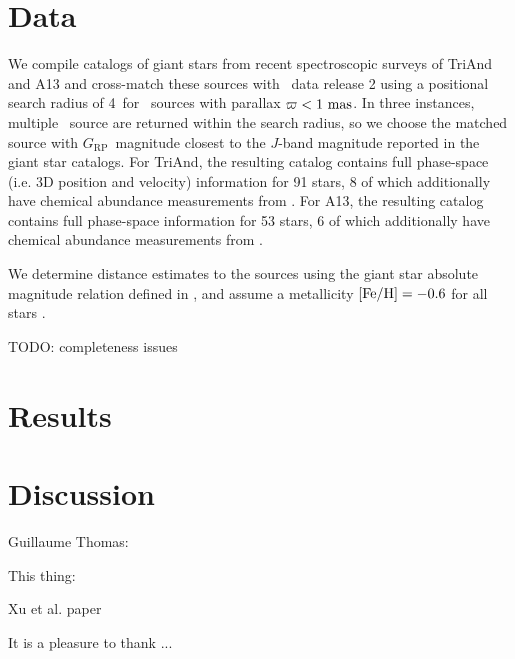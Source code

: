 \documentclass[twocolumn]{aastex62}
\newcommand{\gaia}{\project{Gaia}}
\newcommand{\dr}[1]{\acronym{DR#1}}
\newcommand{\rp}{\ensuremath{G_{\textrm{RP}}}}
\begin{document}
\section{Data}
\label{sec:data}

We compile catalogs of giant stars from recent spectroscopic surveys of TriAnd
and A13 \citep{Sheffield:2014, Li:2017, Bergemann:2018} and cross-match these
sources with \gaia\ data release 2 \citep[\dr{2};][]{TODO} using a positional
search radius of 4\arcsec\ for \gaia\ sources with parallax $\varpi < 1~\textrm{mas}$.
In three instances, multiple \gaia\ source are returned within the search
radius, so we choose the matched source with \rp\ magnitude closest to the
$J$-band magnitude reported in the giant star catalogs.
For TriAnd, the resulting catalog contains full phase-space (i.e. 3D position
and velocity) information for 91 stars, 8 of which additionally have chemical
abundance measurements from \citet{Bergemann:2018}.
For A13, the resulting catalog contains full phase-space information for 53
stars, 6 of which additionally have chemical abundance measurements from
\citet{Bergemann:2018}.

We determine distance estimates to the sources using the giant star absolute
magnitude relation defined in \citet{Sheffield:2014}, and assume a metallicity
${[{\rm Fe}/{\rm H}]} = -0.6$ for all stars \citep[the TriAnd and A13 members with precise
metallicity measurements show a dispersion comparable to the measurement
uncertainty, meaning the metallicity dependence has a small effect on the
distance uncertainty;][]{Bergemann:2018}.

TODO: completeness issues

\section{Results}
\label{sec:results}

\section{Discussion}
\label{sec:discussion}

Guillaume Thomas:

This thing:

Xu et al. paper

\acknowledgements

It is a pleasure to thank ...
\end{document}

